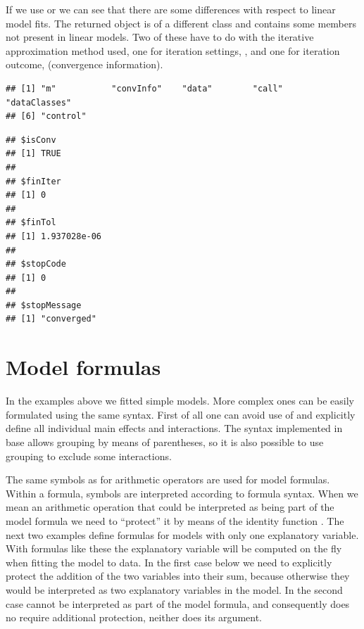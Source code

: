 \documentclass[krantz2]{krantz}\usepackage{knitr}%
\begin{document}
\begin{explainbox}
If we use  or  we can see that there are some differences with respect to linear model fits. The returned object is of a different class and contains some members not present in linear models. Two of these have to do with the iterative approximation method used, one for iteration settings, , and one for iteration outcome,  (convergence information).

\begin{knitrout}\footnotesize
{}\color{fgcolor}\begin{kframe}
\begin{alltt}
\end{alltt}
\begin{verbatim}
## [1] "m"           "convInfo"    "data"        "call"        "dataClasses"
## [6] "control"
\end{verbatim}
\begin{alltt}
\hlopt{$}
\end{alltt}
\begin{verbatim}
## $isConv
## [1] TRUE
## 
## $finIter
## [1] 0
## 
## $finTol
## [1] 1.937028e-06
## 
## $stopCode
## [1] 0
## 
## $stopMessage
## [1] "converged"
\end{verbatim}
\end{kframe}
\end{knitrout}
\end{explainbox}

\section{Model formulas}
In the examples above we fitted simple models. More complex ones can be easily formulated using the same syntax. First of all one can avoid use of \code{*} and explicitly define all individual main effects and interactions. The syntax implemented in base \Rlang allows grouping by means of parentheses, so it is also possible to use grouping to exclude some interactions.

The same symbols as for arithmetic operators are used for model formulas. Within a formula, symbols are interpreted according to formula syntax. When we mean an arithmetic operation that could be interpreted as being part of the model formula we need to ``protect'' it by means of the identity function . The next two examples define formulas for models with only one explanatory variable. With formulas like these the explanatory variable will be computed on the fly when fitting the model to data. In the first case below we need to explicitly protect the addition of the two variables into their sum, because otherwise they would be interpreted as two explanatory variables in the model. In the second case  cannot be interpreted as part of the model formula, and consequently does no require additional protection, neither does its argument.
\end{document}
